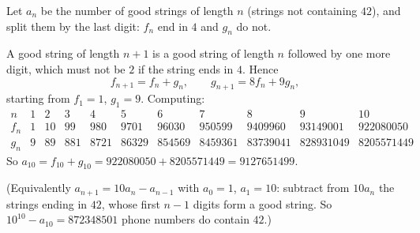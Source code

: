 Let $a_n$ be the number of good strings of length $n$ (strings not containing $42$), and split them by the last digit: $f_n$ end in $4$ and $g_n$ do not.

A good string of length $n+1$ is a good string of length $n$ followed by one more digit, which must not be $2$ if the string ends in $4$. Hence
\[
f_{n+1}=f_n+g_n,\qquad g_{n+1}=8f_n+9g_n ,
\]
starting from $f_1=1$, $g_1=9$. Computing:
\[
\begin{array}{c|cccccccccc}
n&1&2&3&4&5&6&7&8&9&10\\\hline
f_n&1&10&99&980&9701&96030&950599&9409960&93149001&922080050\\
g_n&9&89&881&8721&86329&854569&8459361&83739041&828931049&8205571449
\end{array}
\]
So $a_{10}=f_{10}+g_{10}=922080050+8205571449=\boxed{9127651499}$.

(Equivalently $a_{n+1}=10a_n-a_{n-1}$ with $a_0=1$, $a_1=10$: subtract from $10a_n$ the strings ending in $42$, whose first $n-1$ digits form a good string. So $10^{10}-a_{10}=872348501$ phone numbers do contain $42$.)
